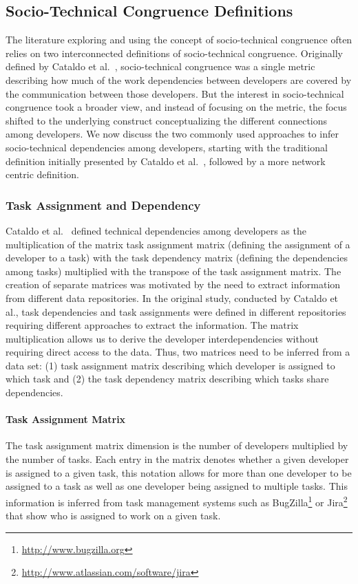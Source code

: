 \subsection{Socio-Technical Congruence Definitions}
The literature exploring and using the concept of socio-technical congruence often relies on two interconnected definitions of socio-technical congruence.
Originally defined by Cataldo et al.~\cite{cataldo:cscw:2006}, socio-technical congruence was a single metric describing how much of the work dependencies between developers are covered by the communication between those developers.
But the interest in socio-technical congruence took a broader view, and instead of focusing on the metric, the focus shifted to the underlying construct conceptualizing the different connections among developers.
We now discuss the two commonly used approaches to infer socio-technical dependencies among developers, starting with the traditional definition initially presented by Cataldo et al.~\cite{cataldo:cscw:2006}, followed by a more network centric definition.

\subsubsection{Task Assignment and Dependency}
Cataldo et al.~\cite{cataldo:cscw:2006} defined  technical dependencies among developers as the multiplication of the matrix task assignment matrix (defining the assignment of a developer to a task) with the task dependency matrix (defining the dependencies among tasks) multiplied with the transpose of the task assignment matrix.
%
The creation of separate matrices was motivated by the need to extract information from different data repositories.
In the original study, conducted by Cataldo et al., task dependencies and task assignments were defined in different repositories requiring different approaches to extract the information.
The matrix multiplication allows us to derive the developer interdependencies without requiring direct access to the data.
%
Thus, two matrices need to be inferred from a data set: (1) task assignment matrix describing which developer is assigned to which task and (2) the task dependency matrix describing which tasks share dependencies.

\paragraph{Task Assignment Matrix}
The task assignment matrix dimension is the number of developers multiplied by the number of tasks.
Each entry in the matrix denotes whether a given developer is assigned to a given task, this notation allows for more than one developer to be assigned to a task as well as one developer being assigned to multiple tasks.
This information is inferred from task management systems such as BugZilla\footnote{\url{http://www.bugzilla.org}} or Jira\footnote{\url{http://www.atlassian.com/software/jira}} that show who is assigned to work on a given task.


